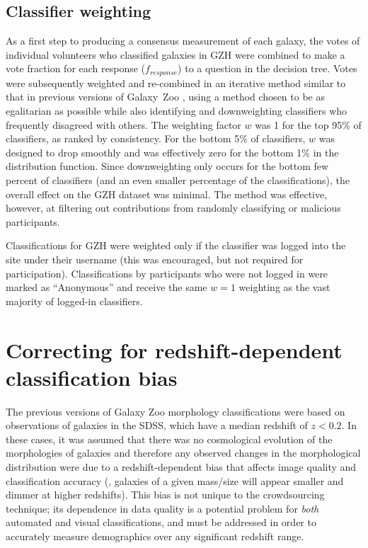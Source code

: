 \documentclass[a4paper,fleqn,usenatbib]{mnras}
\begin{document}
\subsection{Classifier weighting}\label{ssec:weighting}

As a first step to producing a consensus measurement of each galaxy, the votes
of individual volunteers who classified galaxies in GZH were combined to make a
vote fraction for each response ($f_{response}$) to a question in the decision
tree. Votes were subsequently weighted and re-combined in an iterative method
similar to that in previous versions of Galaxy~Zoo \citep{lan08,wil13}, using a
method chosen to be as egalitarian as possible while also identifying and
downweighting classifiers who frequently disagreed with others. The weighting
factor $w$ was 1 for the top 95\% of classifiers, as ranked by consistency.
For the bottom 5\% of classifiers, $w$ was designed to drop smoothly and was
effectively zero for the bottom 1\% in the distribution function. Since
downweighting only occurs for the bottom few percent of classifiers (and an even smaller
percentage of the classifications), the overall effect on the GZH dataset was
minimal. The method was effective, however, at filtering out contributions from
randomly classifying or malicious participants.

Classifications for GZH were weighted only if the classifier was logged
into the site under their username (this was encouraged, but not required for
participation). Classifications by participants who were not logged in were marked as
``Anonymous'' and receive the same $w=1$ weighting as the vast majority of
logged-in classifiers. 


\section{Correcting for redshift-dependent classification bias}\label{sec:debiasing}

The previous versions of Galaxy Zoo morphology classifications
\citep{lin11,wil13} were based on observations of galaxies in the SDSS,
which have a median redshift of $z<0.2$. In these cases, it
was assumed that there was no cosmological evolution of the morphologies of
galaxies and therefore any observed changes in the morphological distribution
were due to a redshift-dependent bias that affects image quality and
classification accuracy (\ie, galaxies of a given mass/size will appear smaller
and dimmer at higher redshifts).  This bias is not unique to the crowdsourcing
technique; its dependence in data quality is a potential problem for
\emph{both} automated and visual classifications, and must be addressed in
order to accurately measure demographics over any significant redshift range. 
\end{document}
